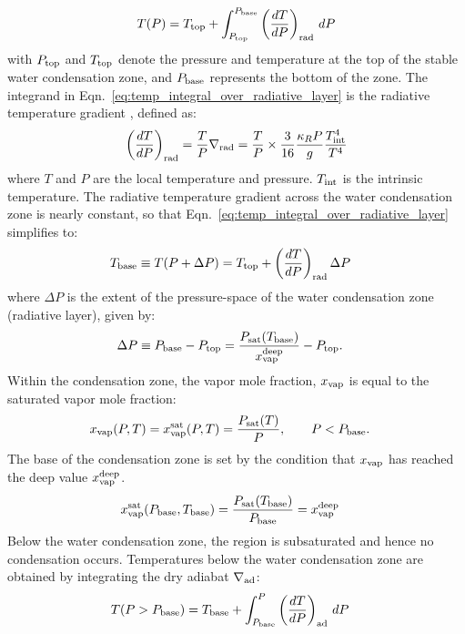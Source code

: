 \documentclass[11pt]{ucscthesisbs}
\begin{document}
\begin{equation}
  T(P) = T_{\rm top} + \int_{P_{\rm top}}^{P_{\rm base}} \left(\frac{dT}{dP}\right)_{\rm rad}\,d P
  \label{eq:temp_integral_over_radiative_layer}
\end{equation}
with $P_{\rm top}$ and $T_{\rm top}$ denote the pressure and temperature at the top of the stable water condensation zone, and $P_{\rm base}$ represents the bottom of the zone. The integrand in Eqn.~\ref{eq:temp_integral_over_radiative_layer} is the radiative temperature gradient \citep{leconte_2017}, defined as:
\begin{align}
  \left(\frac{dT}{dP}\right)_{\rm rad}=\frac{T}{P}\nabla_{\rm rad}
  = \frac{T}{P}\times\frac{3}{16}\frac{\kappa_R P}{g}\frac{T_{\rm int}^4}{T^4}
  \label{eq:radiative_gradient}
\end{align}
where $T$ and $P$ are the local temperature and pressure. $T_{\rm int}$ is the intrinsic temperature. The radiative temperature gradient across the water condensation zone is nearly constant, so that Eqn.~\ref{eq:temp_integral_over_radiative_layer} simplifies to:
\begin{align}
T_{\rm base}\equiv T(P+\Delta P) &= T_{\rm top} + \left(\frac{dT}{dP}\right)_{\rm rad}\Delta P
\label{eq:temperature_profile_over_radiative_layer_simplification}
\end{align}
where $\Delta P$ is the extent of the pressure-space of the water condensation zone (radiative layer), given by:
\begin{align}
\Delta P \equiv P_{\rm base}-P_{\rm top} &= \frac{P_{\rm sat}(T_{\rm base})}{x_{\rm vap}^{\rm deep}} - P_{\rm top}.
\label{eq:delta_P_over_radiative_layer}
\end{align}
Within the condensation zone, the vapor mole fraction, $x_{\rm vap}$ is equal to the saturated vapor mole fraction:
\begin{align}
x_{\rm vap}(P, T) &= x_{\rm vap}^{\rm sat}(P, T) = \frac{P_{\rm sat}(T)}{P}, \qquad P<P_{\rm base}.
\label{eq:vapor_mole_fraction_within_condensation_zone}
\end{align}
The base of the condensation zone is set by the condition that $x_{\rm vap}$ has reached the deep value $x_{\rm vap}^{\rm deep}$.
\begin{align}
x_{\rm vap}^{\rm sat}(P_{\rm base}, T_{\rm base}) &= \frac{P_{\rm sat}(T_{\rm base})}{P_{\rm base}}=x_{\rm vap}^{\rm deep}
\end{align}
Below the water condensation zone, the region is subsaturated and hence no condensation occurs. Temperatures below the water condensation zone are obtained by integrating the dry adiabat $\nabla_{\rm ad}$:
\begin{align}
T(P>P_{\rm base}) &= T_{\rm base} + \int_{P_{\rm base}}^P\left(\frac{dT}{dP}\right)_{\rm ad}\,d P
\label{eq:dry_adiabat_integration}
\end{align}
\end{document}
